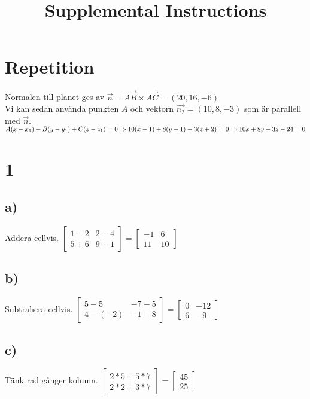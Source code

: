 \documentclass{article}
\title{Supplemental Instructions}
\date{
     }
\begin{document}
\maketitle

\section*{Repetition}
Normalen till planet ges av $\overrightarrow{n}=\overrightarrow{AB} \times 
\overrightarrow{AC} = (20,16,-6)$\\
Vi kan sedan använda punkten $A$ och vektorn $\overrightarrow{n_{2}}=
(10,8,-3)$ som är parallell med $\overrightarrow{n}$.\\
$A(x-x_{1})+B(y-y_{1})+C(z-z_{1})=0 \Rightarrow \\
10(x-1)+8(y-1)-3(z+2)=0 \Rightarrow \\
10x+8y-3z-24=0$

\section*{1}
\subsection*{a)}
Addera cellvis.
$ 
    			\begin{bmatrix}
    			1-2 & 2+4 \\
    			5+6 & 9+1
    			\end{bmatrix}
    			=
    			\begin{bmatrix}
    			-1 & 6 \\
    			11  & 10
    			\end{bmatrix}
    			$
    			
\subsection*{b)}
Subtrahera cellvis.
$ 
    			\begin{bmatrix}
    			5-5 & -7-5 \\
    			4-(-2) & -1-8
    			\end{bmatrix}
    			=
    			\begin{bmatrix}
    			0 & -12 \\
    			6  & -9
    			\end{bmatrix}
    			$
    			
\subsection*{c)}
Tänk rad gånger kolumn.
$ 
    			\begin{bmatrix}
    			2*5+5*7  \\
    			2*2+3*7
    			\end{bmatrix}
    			=
    			\begin{bmatrix}
    			45  \\
    			25
    			\end{bmatrix}
    			$
\end{document}
